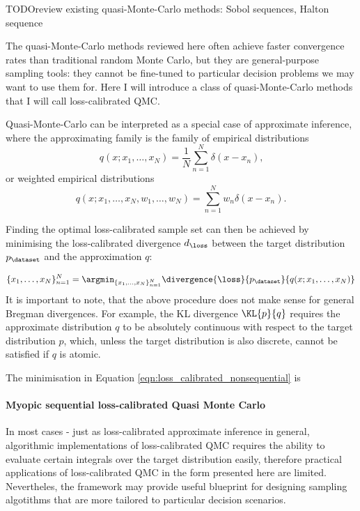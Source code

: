 TODO{review existing quasi-Monte-Carlo methods: Sobol sequences, Halton sequence}

The quasi-Monte-Carlo methods reviewed here often achieve faster convergence rates than traditional random Monte Carlo, but they are general-purpose sampling tools: they cannot be fine-tuned to particular decision problems we may want to use them for. Here I will introduce a class of quasi-Monte-Carlo methods that I will call loss-calibrated QMC. 

Quasi-Monte-Carlo can be interpreted as a special case of approximate inference, where the approximating family is the family of empirical distributions
\begin{equation}
	q(x ; x_1,\ldots,x_N) = \frac{1}{N} \sum_{n=1}^{N} \delta(x - x_n)\mbox{,}
\end{equation}
or weighted empirical distributions
\begin{equation}
	q(x ; x_1,\ldots,x_N,w_1,\ldots,w_N) = \sum_{n=1}^{N} w_n \delta(x - x_n)\mbox{.}
\end{equation}

Finding the optimal loss-calibrated sample set can then be achieved by minimising the loss-calibrated divergence $d_\loss$ between the target distribution $p_\dataset$ and the approximation $q$:

\begin{equation}
	\{x_1,\ldots,x_N\}_{n=1}^{N} = \argmin_{\{x_1,\ldots,x_N\}_{n=1}^{N}} \divergence{\loss}{p_\dataset}{q(x ; x_1,\ldots,x_N)} \label{eqn:loss_calibrated_nonsequential}
\end{equation}
It is important to note, that the above procedure does not make sense for general Bregman divergences. For example, the KL divergence $\KL{p}{q}$ requires the approximate distribution $q$ to be absolutely continuous with respect to the target distribution $p$, which, unless the target distribution is also discrete, cannot be satisfied if $q$ is atomic.

The minimisation in Equation \eqref{eqn:loss_calibrated_nonsequential} is 
\paragraph{Myopic sequential loss-calibrated Quasi Monte Carlo}


In most cases - just as loss-calibrated approximate inference in general, algorithmic implementations of loss-calibrated QMC requires the ability to evaluate certain integrals over the target distribution easily, therefore practical applications of loss-calibrated QMC in the form presented here are limited. Nevertheles, the framework may provide useful blueprint for designing sampling algotithms that are more tailored to particular decision scenarios.

